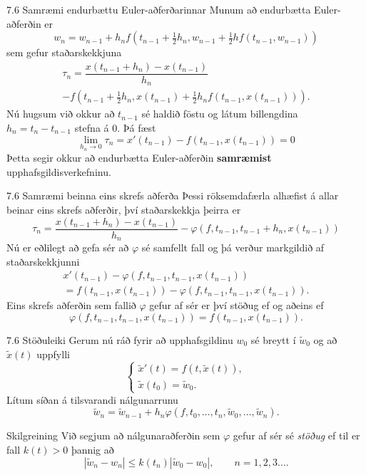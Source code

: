 \begin{frame}{7.6 Samræmi endurbættu Euler-aðferðarinnar} 
Munum að endurbætta Euler-aðferðin er
$$
  w_n=w_{n-1}+h_nf(t_{n-1}+\tfrac 12 h_n,w_{n-1}+\tfrac 12 hf(t_{n-1},w_{n-1}))
$$
sem gefur staðarskekkjuna
\begin{multline*}
\tau_n=\dfrac{x(t_{n-1}+h_n)-x(t_{n-1})}{h_n}\\
-f(t_{n-1}+\tfrac 12 h_n,x(t_{n-1})+\tfrac 12 h_nf(t_{n-1},x(t_{n-1}))).
  \end{multline*}
\pause
Nú hugsum við okkur að $t_{n-1}$ sé haldið föstu og látum billengdina
$h_n=t_n-t_{n-1}$ stefna á $0$.  Þá fæst
$$
  \lim_{h_n\to 0} \tau_n= x'(t_{n-1})-f(t_{n-1},x(t_{n-1}))=0
$$
Þetta segir okkur að endurbætta Euler-aðferðin {\bf samræmist} 
upphafsgildisverkefninu.
\end{frame}


\begin{frame}{7.6 Samræmi beinna eins skrefs aðferða} 
Þessi röksemdafærla alhæfist á allar beinar eins skrefs aðferðir, því
staðarskekkja þeirra er 
$$
\tau_n=\dfrac{x(t_{n-1}+h_n)-x(t_{n-1})}{h_n}
-\varphi(f,t_{n-1},t_{n-1}+h_n,x(t_{n-1}))
$$
\pause
Nú er eðlilegt að gefa sér að $\varphi$ sé samfellt fall og
þá verður markgildið af staðarskekkjunni
\begin{multline*}
x'(t_{n-1})-\varphi(f,t_{n-1},t_{n-1},x(t_{n-1}))\\
=f(t_{n-1},x(t_{n-1}))-\varphi(f,t_{n-1},t_{n-1},x(t_{n-1})).
\end{multline*}
Eins skrefs aðferðin sem fallið $\varphi$ gefur af sér er því 
stöðug ef og aðeins ef 
$$
\varphi(f,t_{n-1},t_{n-1},x(t_{n-1}))
=f(t_{n-1},x(t_{n-1})).
$$
\end{frame}


\begin{frame}{7.6 Stöðuleiki} 
Gerum nú ráð fyrir að upphafsgildinu $w_0$ sé breytt í $\tilde w_0$ og
að $\tilde x(t)$ uppfylli
$$
\begin{cases}
  \tilde x'(t)=f(t,\tilde x(t)),\\
\tilde x(t_0)=\tilde w_0.
\end{cases}
$$
Lítum síðan á tilsvarandi nálgunarrunu
$$
\tilde w_n=\tilde w_{n-1}+h_n\varphi(f,t_0,\dots,t_n,\tilde
w_0,\dots,\tilde w_n).
$$
\pause
\begin{block}{Skilgreining}
Við segjum að nálgunaraðferðin sem $\varphi$ gefur af sér 
sé {\it stöðug} ef til er fall $k(t)>0$ þannig að
$$
|\tilde w_n-w_n|\leq k(t_n)|\tilde w_0-w_0|, \qquad n=1,2,3\dots.
$$
\end{block}
\end{frame}


